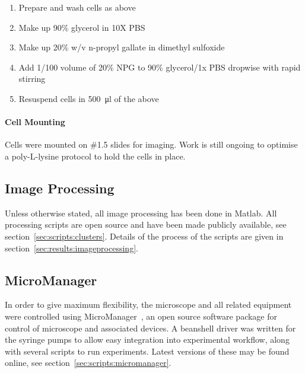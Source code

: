 \documentclass[../main.tex]{subfiles}
\begin{document}
\begin{enumerate}
\item Prepare and wash cells as above
\item Make up 90\% glycerol in 10X PBS
\item Make up 20\% w/v n-propyl gallate in dimethyl sulfoxide
\item Add 1/100 volume of 20\% NPG to 90\% glycerol/1x PBS dropwise with rapid stirring
\item Resuspend cells in \SI{500}{\micro\litre} of the above
\end{enumerate}

\paragraph{Cell Mounting} Cells were mounted on \#1.5 slides for imaging. Work is still ongoing to optimise a poly-L-lysine protocol to hold the cells in place.


\subsection{Image Processing}
\label{sec:method:imageproc}
Unless otherwise stated, all image processing has been done in Matlab. All processing scripts are open source and have been made publicly available, see section~\ref{sec:scripts:clusters}. Details of the process of the scripts are given in section~\ref{sec:results:imageprocessing}.

\subsection{MicroManager}

In order to give maximum flexibility, the microscope and all related equipment were controlled using MicroManager~\citep{micromanager}, an open source software package for control of microscope and associated devices. A beanshell driver was written for the syringe pumps to allow easy integration into experimental workflow, along with several scripts to run experiments. Latest versions of these may be found online, see section~\ref{sec:scripts:micromanager}.
\end{document}

